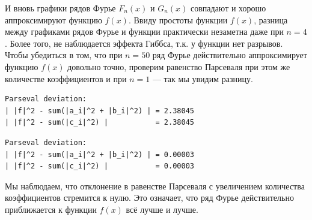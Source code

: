\documentclass[a4paper]{article}
\begin{document}
И вновь графики рядов Фурье $F_n(x)$ и $G_n(x)$ совпадают и хорошо аппроксимируют функцию $f(x)$. Ввиду простоты функции $f(x)$, разница между графиками рядов Фурье и функции практически незаметна даже при $n = 4$. Более того, не наблюдается эффекта Гиббса, т.к. у функции нет разрывов.\\[0.5em]
Чтобы убедиться в том, что при $n = 50$ ряд Фурье действительно аппроксимирует функцию $f(x)$ довольно точно, проверим равенство Парсеваля при этом же количестве коэффициентов и при $n = 1$ --- так мы увидим разницу.
\begin{minipage}{0.48\textwidth}
\begin{lstlisting}[caption={Равенство Парасеваля при $n=1$}]
Parseval deviation:
| |f|^2 - sum(|a_i|^2 + |b_i|^2) | = 2.38045
| |f|^2 - sum(|c_i|^2) |           = 2.38045
\end{lstlisting}
\end{minipage}\hfill
\begin{minipage}{0.49\textwidth}
\begin{lstlisting}[caption={Равенство Парасеваля при $n=50$}, numbers=none]
Parseval deviation:
| |f|^2 - sum(|a_i|^2 + |b_i|^2) | = 0.00003
| |f|^2 - sum(|c_i|^2) |           = 0.00003
\end{lstlisting}
\end{minipage}
Мы наблюдаем, что отклонение в равенстве Парсеваля с увеличением количества коэффициентов стремится к нулю. Это означает, что ряд Фурье действительно приближается к функции $f(x)$ всё лучше и лучше.\\[0.5em]
\end{document}
